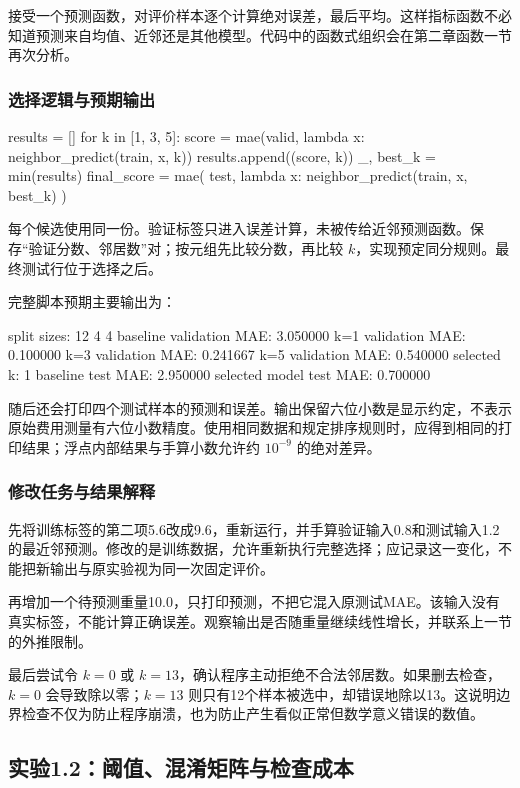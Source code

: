 \documentclass[UTF8,fontset=none,zihao=-4,a4paper]{ctexart}
\newcommand{\code}[1]{\texttt{\detokenize{#1}}}
\numberwithin{equation}{section}
\numberwithin{figure}{section}
\begin{document}
\code{mae}接受一个预测函数，对评价样本逐个计算绝对误差，最后平均。这样指标函数不必知道预测来自均值、近邻还是其他模型。代码中的函数式组织会在第二章函数一节再次分析。

\subsubsection{选择逻辑与预期输出}
\begin{pycode}
results = []
for k in [1, 3, 5]:
    score = mae(valid, lambda x: neighbor_predict(train, x, k))
    results.append((score, k))
_, best_k = min(results)
final_score = mae(
    test, lambda x: neighbor_predict(train, x, best_k)
)
\end{pycode}
每个候选使用同一份\code{train}。验证标签只进入误差计算，未被传给近邻预测函数。\code{results}保存“验证分数、邻居数”对；\code{min}按元组先比较分数，再比较 $k$，实现预定同分规则。最终测试行位于选择之后。

完整脚本预期主要输出为：
\begin{console}
split sizes: 12 4 4
baseline validation MAE: 3.050000
k=1 validation MAE: 0.100000
k=3 validation MAE: 0.241667
k=5 validation MAE: 0.540000
selected k: 1
baseline test MAE: 2.950000
selected model test MAE: 0.700000
\end{console}
随后还会打印四个测试样本的预测和误差。输出保留六位小数是显示约定，不表示原始费用测量有六位小数精度。使用相同数据和规定排序规则时，应得到相同的打印结果；浮点内部结果与手算小数允许约 $10^{-9}$ 的绝对差异。

\subsubsection{修改任务与结果解释}
先将训练标签的第二项5.6改成9.6，重新运行，并手算验证输入0.8和测试输入1.2的最近邻预测。修改的是训练数据，允许重新执行完整选择；应记录这一变化，不能把新输出与原实验视为同一次固定评价。

再增加一个待预测重量10.0，只打印预测，不把它混入原测试MAE。该输入没有真实标签，不能计算正确误差。观察输出是否随重量继续线性增长，并联系上一节的外推限制。

最后尝试令 $k=0$ 或 $k=13$，确认程序主动拒绝不合法邻居数。如果删去检查，$k=0$ 会导致除以零；$k=13$ 则只有12个样本被选中，却错误地除以13。这说明边界检查不仅为防止程序崩溃，也为防止产生看似正常但数学意义错误的数值。

\subsection{实验1.2：阈值、混淆矩阵与检查成本}
\end{document}
